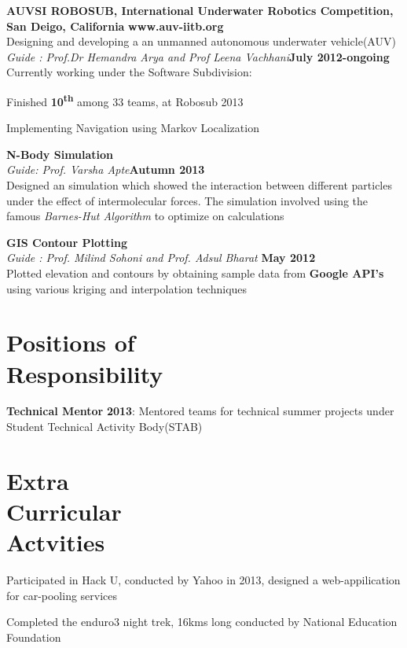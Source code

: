 \documentclass[margin,11pt]{resume}
\begin{document}
\begin{resume}
\textbf{AUVSI ROBOSUB, International Underwater Robotics Competition, San Deigo, California } \hfill \textbf{www.auv-iitb.org}
\vspace{1mm}\\ 
				Designing and developing a an unmanned autonomous underwater vehicle(AUV) 
				\textsl{Guide : Prof.Dr Hemandra Arya and Prof Leena Vachhani}\hfill \textbf{July 2012-ongoing}\\
				Currently working under the Software Subdivision:
				\begin{list2} 
				\item Finished \textbf{10\textsuperscript{th}} among 33 teams, at Robosub 2013
				\item Implementing Navigation using Markov Localization
				\end{list2}
				\vspace{-3mm}
\textbf{N-Body Simulation}\vspace{1mm} \hfill\\ 
				\textsl{Guide: Prof. Varsha Apte}\hfill \textbf{Autumn 2013}\\
				Designed an simulation which showed the interaction between different particles under the effect of intermolecular forces. The simulation involved using the famous \emph{Barnes-Hut Algorithm} to optimize on calculations \vspace{-2.75mm} 

\textbf{GIS Contour Plotting}\vspace{1mm} \hfill\\ 
				\textsl{Guide : Prof. Milind Sohoni and Prof. Adsul Bharat}	\hfill \textbf{May 2012}\\
				Plotted elevation and contours by obtaining sample data from \textbf{Google API's} using various kriging and interpolation techniques\vspace{-2.75mm} 

 
\section{\mysidestyle Positions of\\ Responsibility}

\begin{list2}
\item \textbf{Technical Mentor} \hfill\textbf{2013}: Mentored teams for technical summer projects under Student Technical Activity Body(STAB)
\end{list2}
\vspace{-3mm}
\section{\mysidestyle Extra\\Curricular\\Actvities}
\begin{list2}
\item Participated in  Hack U, conducted by Yahoo in 2013, designed a web-appilication for car-pooling services 
\item Completed the enduro3 night trek, 16kms long conducted by National Education Foundation
\end{list2}
\vspace{-3mm}

\end{resume}
\end{document}
